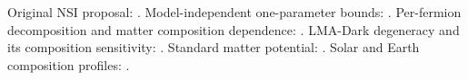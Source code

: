 \begin{refbox}
Original NSI proposal: \cite{Grossman1995}. Model-independent one-parameter
bounds: \cite{BiggioBlennowFM2009}. Per-fermion decomposition and matter
composition dependence: \cite{OhlssonNSIReview2013,FarzanTortolaNSIReview2018,KikuchiMinakataUchinami2009}.
LMA-Dark degeneracy and its composition sensitivity:
\cite{Esteban2018LMADark,ColomaEtAl2017DarkSide}. Standard matter potential:
\cite{Wolfenstein1978,MikheyevSmirnov1985}. Solar and Earth composition
profiles: \cite{Vinyoles2017B16,DziewonskiAnderson1981}.
\end{refbox}
